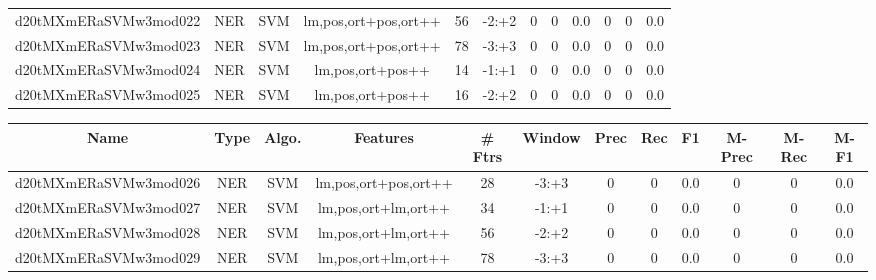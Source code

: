 \documentclass[a4paper]{article}
\begin{document}
\begin{landscape}
\begin{center}
\begin{tabular}{ |c|c|c|c|c|c|c|c|c|c|c|c|}
 
 	
 	\small{ d20tMXmERaSVMw3mod022 } & \small{ NER} & \small{  SVM }  & lm,pos,ort+pos,ort++  &  56 &  \small{  -2:+2 }  &  0 & 0 & 0.0  &  0 & 0 & 0.0 \\
 	

 
 	
 	\small{ d20tMXmERaSVMw3mod023 } & \small{ NER} & \small{  SVM }  & lm,pos,ort+pos,ort++  &  78 &  \small{  -3:+3 }  &  0 & 0 & 0.0  &  0 & 0 & 0.0 \\
 	

 
 	
 	\small{ d20tMXmERaSVMw3mod024 } & \small{ NER} & \small{  SVM }  & lm,pos,ort+pos++  &  14 &  \small{  -1:+1 }  &  0 & 0 & 0.0  &  0 & 0 & 0.0 \\
 	

 
 	
 	\small{ d20tMXmERaSVMw3mod025 } & \small{ NER} & \small{  SVM }  & lm,pos,ort+pos++  &  16 &  \small{  -2:+2 }  &  0 & 0 & 0.0  &  0 & 0 & 0.0 \\
 	
 \hline
\end{tabular}
\end{center}




\begin{center}
\begin{tabular}{ |c|c|c|c|c|c|c|c|c|c|c|c|} 
 \hline
 	Name & Type & Algo. & Features & \# Ftrs & Window & Prec & Rec & F1 & M-Prec & M-Rec & M-F1\\
 \hline

 	

 
 	
 	\small{ d20tMXmERaSVMw3mod026 } & \small{ NER} & \small{  SVM }  & lm,pos,ort+pos,ort++  &  28 &  \small{  -3:+3 }  &  0 & 0 & 0.0  &  0 & 0 & 0.0 \\
 	

 
 	
 	\small{ d20tMXmERaSVMw3mod027 } & \small{ NER} & \small{  SVM }  & lm,pos,ort+lm,ort++  &  34 &  \small{  -1:+1 }  &  0 & 0 & 0.0  &  0 & 0 & 0.0 \\
 	

 
 	
 	\small{ d20tMXmERaSVMw3mod028 } & \small{ NER} & \small{  SVM }  & lm,pos,ort+lm,ort++  &  56 &  \small{  -2:+2 }  &  0 & 0 & 0.0  &  0 & 0 & 0.0 \\
 	

 
 	
 	\small{ d20tMXmERaSVMw3mod029 } & \small{ NER} & \small{  SVM }  & lm,pos,ort+lm,ort++  &  78 &  \small{  -3:+3 }  &  0 & 0 & 0.0  &  0 & 0 & 0.0 \\
 	


\end{tabular}
\end{center}
\end{landscape}
\end{document}
